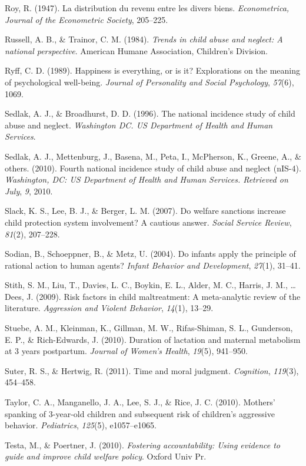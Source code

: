 \documentclass[review]{elsarticle}\usepackage[]{graphicx}\usepackage[]{color}
\begin{document}
Roy, R. (1947). La distribution du revenu entre les divers biens.
\emph{Econometrica, Journal of the Econometric Society}, 205--225.

Russell, A. B., \& Trainor, C. M. (1984). \emph{Trends in child abuse
and neglect: A national perspective}. American Humane Association,
Children's Division.

Ryff, C. D. (1989). Happiness is everything, or is it? Explorations on
the meaning of psychological well-being. \emph{Journal of Personality
and Social Psychology}, \emph{57}(6), 1069.

Sedlak, A. J., \& Broadhurst, D. D. (1996). The national incidence study
of child abuse and neglect. \emph{Washington DC. US Department of Health
and Human Services}.

Sedlak, A. J., Mettenburg, J., Basena, M., Peta, I., McPherson, K.,
Greene, A., \& others. (2010). Fourth national incidence study of child
abuse and neglect (nIS-4). \emph{Washington, DC: US Department of Health
and Human Services. Retrieved on July}, \emph{9}, 2010.

Slack, K. S., Lee, B. J., \& Berger, L. M. (2007). Do welfare sanctions
increase child protection system involvement? A cautious answer.
\emph{Social Service Review}, \emph{81}(2), 207--228.

Sodian, B., Schoeppner, B., \& Metz, U. (2004). Do infants apply the
principle of rational action to human agents? \emph{Infant Behavior and
Development}, \emph{27}(1), 31--41.

Stith, S. M., Liu, T., Davies, L. C., Boykin, E. L., Alder, M. C.,
Harris, J. M., \ldots{} Dees, J. (2009). Risk factors in child
maltreatment: A meta-analytic review of the literature. \emph{Aggression
and Violent Behavior}, \emph{14}(1), 13--29.

Stuebe, A. M., Kleinman, K., Gillman, M. W., Rifas-Shiman, S. L.,
Gunderson, E. P., \& Rich-Edwards, J. (2010). Duration of lactation and
maternal metabolism at 3 years postpartum. \emph{Journal of Women's
Health}, \emph{19}(5), 941--950.

Suter, R. S., \& Hertwig, R. (2011). Time and moral judgment.
\emph{Cognition}, \emph{119}(3), 454--458.

Taylor, C. A., Manganello, J. A., Lee, S. J., \& Rice, J. C. (2010).
Mothers' spanking of 3-year-old children and subsequent risk of
children's aggressive behavior. \emph{Pediatrics}, \emph{125}(5),
e1057--e1065.

Testa, M., \& Poertner, J. (2010). \emph{Fostering accountability: Using
evidence to guide and improve child welfare policy}. Oxford Univ Pr.
\end{document}
